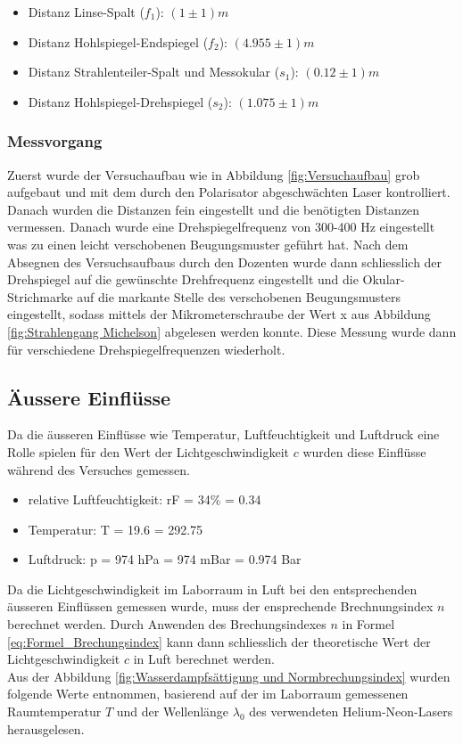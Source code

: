\begin{itemize}
\item Distanz Linse-Spalt ($f_{1}$): $(1\pm 1)m$
\item Distanz Hohlspiegel-Endspiegel ($f_{2}$): $(4.955\pm 1)m$
\item Distanz Strahlenteiler-Spalt und Messokular ($s_{1}$): $(0.12\pm 1)m$
\item Distanz Hohlspiegel-Drehspiegel ($s_{2}$): $(1.075\pm 1)m$
\end{itemize}

\subsubsection{Messvorgang}

Zuerst wurde der Versuchaufbau wie in Abbildung \ref{fig:Versuchaufbau} grob aufgebaut und mit dem durch den Polarisator abgeschwächten Laser kontrolliert. Danach wurden die Distanzen fein eingestellt und die benötigten Distanzen vermessen. Danach wurde eine Drehspiegelfrequenz von 300-400 Hz eingestellt was zu einen leicht verschobenen Beugungsmuster geführt hat. Nach dem Absegnen des Versuchsaufbaus durch den Dozenten wurde dann schliesslich der Drehspiegel auf die gewünschte Drehfrequenz eingestellt und die Okular-Strichmarke auf die markante Stelle des verschobenen Beugungsmusters eingestellt, sodass mittels der Mikrometerschraube der Wert x aus Abbildung \ref{fig:Strahlengang Michelson} abgelesen werden konnte. Diese Messung wurde dann für verschiedene Drehspiegelfrequenzen wiederholt.

\subsection{Äussere Einflüsse}
\label{sec:Äussere Einflüsse}

Da die äusseren Einflüsse wie Temperatur, Luftfeuchtigkeit und Luftdruck eine Rolle spielen für den Wert der Lichtgeschwindigkeit $c$ wurden diese Einflüsse während des Versuches gemessen.

\begin{itemize}
\item relative Luftfeuchtigkeit: rF = 34\% = 0.34
\item Temperatur: T = 19.6 = 292.75
\item Luftdruck: p = 974 hPa = 974 mBar = 0.974 Bar
\end{itemize}

Da die Lichtgeschwindigkeit im Laborraum in Luft bei den entsprechenden äusseren Einflüssen gemessen wurde, muss der ensprechende Brechnungsindex $n$ berechnet werden. Durch Anwenden des Brechungsindexes $n$ in Formel \ref{eq:Formel_Brechungsindex} kann dann schliesslich der theoretische Wert der Lichtgeschwindigkeit $c$ in Luft berechnet werden.\\[4mm]
Aus der Abbildung \ref{fig:Wasserdampfsättigung und Normbrechungsindex} wurden folgende Werte entnommen, basierend auf der im Laborraum gemessenen Raumtemperatur $T$ und der Wellenlänge $\lambda_{0}$ des verwendeten Helium-Neon-Lasers herausgelesen.

